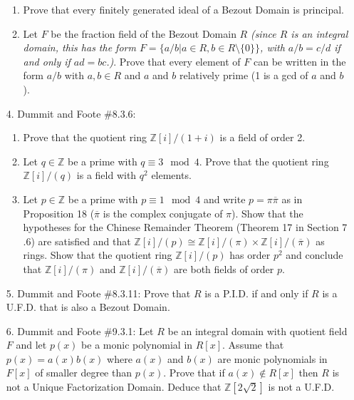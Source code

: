\documentclass[12pt]{article}
\newcommand{\Z}{\mathbb{Z}}
\newcommand{\ba}{\overline}
\begin{document}
\begin{enumerate}
\begin{enumerate}
    \item Prove that every finitely generated ideal of a Bezout Domain is principal.

    \item Let $F$ be the fraction field of the Bezout Domain $R$ \emph{(since $R$ is an integral domain, this has the form $F = \{a/b | a\in R, b\in R\setminus\{0\}\}$, with $a/b = c/d$ if and only if $ad = bc$.)}. Prove that every element of $F$ can be written in the form $a/b$ with $a, b\in R$ and $a$ and $b$ relatively prime (1 is a gcd of $a$ and $b$).

\end{enumerate}

\item[4.] Dummit and Foote \#8.3.6: 

\begin{enumerate}
    \item Prove that the quotient ring $\Z[i]/(1 + i)$ is a field of order 2.
    
    \item Let $q\in \Z$ be a prime with $q\equiv 3 \mod 4$. Prove that the quotient ring $\Z[i]/(q)$ is a field with $q^2$ elements.
    
    \item Let $p\in\Z$ be a prime with $p\equiv 1 \mod 4$ and write $p = \pi\ba{\pi}$  as in Proposition 18 ($\ba{\pi}$ is the complex conjugate of $\pi$). Show that the hypotheses for the Chinese Remainder Theorem (Theorem 17 in Section 7 .6) are satisfied and that $\Z[i]/(p)\cong \Z[i]/(\pi)\times \Z[i]/(\ba{\pi})$ as rings. Show that the quotient ring $\Z[i]/(p)$ has order $p^2$ and conclude that $\Z[i]/(\pi)$ and $\Z[i]/(\ba{\pi})$ are both fields of order $p$.

\end{enumerate}

\item[5.] Dummit and Foote \#8.3.11: Prove that $R$ is a P.I.D. if and only if $R$ is a U.F.D. that is
also a Bezout Domain.


\item[6.] Dummit and Foote \#9.3.1: Let $R$ be an integral domain with quotient field $F$ and let $p(x)$ be a monic polynomial in $R[x]$. Assume that $p(x) = a(x)b(x)$ where $a (x)$ and $b(x)$ are monic polynomials in $F[x]$ of smaller degree than $p(x)$. Prove that if $a(x)\notin R[x]$ then $R$ is not a Unique Factorization Domain. Deduce that $\Z[2\sqrt{2}]$ is not a U.F.D.


\end{enumerate}
\end{document}
